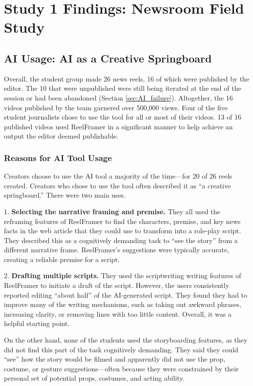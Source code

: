 \section{Study 1 Findings: Newsroom Field Study}

\subsection{AI Usage: AI as a Creative Springboard}

Overall, the student group made 26 news reels, 16 of which were published by the editor. 
The 10 that were unpublished were still being iterated at the end of the session or had been abandoned (Section \ref{sec:AI_failure}).
Altogether, the 16 videos published by the team garnered over 500,000 views. 
Four of the five student journalists chose to use the tool for all or most of their videos. 
13 of 16 published videos used ReelFramer in a significant manner to help achieve an output the editor deemed publishable. 

\subsubsection{Reasons for AI Tool Usage}
Creators choose to use the AI tool a majority of the time---for 20 of 26 reels created.
Creators who chose to use the tool often described it as ``a creative springboard.'' 
There were two main uses. 

1. \textbf{Selecting the narrative framing and premise.} 
They all used the reframing features of ReelFramer to find the characters, premise, and key news facts in the web article that they could use to transform into a role-play script.  
They described this as a cognitively demanding task to ``see the story'' from a different narrative frame. ReelFramer's suggestions were typically accurate, creating a reliable premise for a script.

2. \textbf{Drafting multiple scripts.} 
They used the scriptwriting writing features of ReelFramer to initiate a draft of the script. 
However, the users consistently reported editing ``about half'' of the AI-generated script. 
They found they had to improve many of the writing mechanisms, such as taking out awkward phrases, increasing clarity, or removing lines with too little content. 
Overall, it was a helpful starting point.

On the other hand, none of the students used the storyboarding features, as they did not find this part of the task cognitively demanding. 
They said they could ``see'' how the story would be filmed and apparently did not use the prop, costume, or gesture suggestions---often because they were constrained by their personal set of potential props, costumes, and acting ability. 

